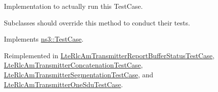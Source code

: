 Implementation to actually run this Test\+Case. 

Subclasses should override this method to conduct their tests. 

Implements \hyperlink{classns3_1_1TestCase_a8ff74680cf017ed42011e4be51917a24}{ns3\+::\+Test\+Case}.



Reimplemented in \hyperlink{classLteRlcAmTransmitterReportBufferStatusTestCase_aaddc27c1dd83c3856296c778210c5df2}{Lte\+Rlc\+Am\+Transmitter\+Report\+Buffer\+Status\+Test\+Case}, \hyperlink{classLteRlcAmTransmitterConcatenationTestCase_abb245b1b72965664fb72b8829853703e}{Lte\+Rlc\+Am\+Transmitter\+Concatenation\+Test\+Case}, \hyperlink{classLteRlcAmTransmitterSegmentationTestCase_a8bec2147bdbf3f5cade130c101a09374}{Lte\+Rlc\+Am\+Transmitter\+Segmentation\+Test\+Case}, and \hyperlink{classLteRlcAmTransmitterOneSduTestCase_ad0363c6b1e92694b98291cbca113501a}{Lte\+Rlc\+Am\+Transmitter\+One\+Sdu\+Test\+Case}.


